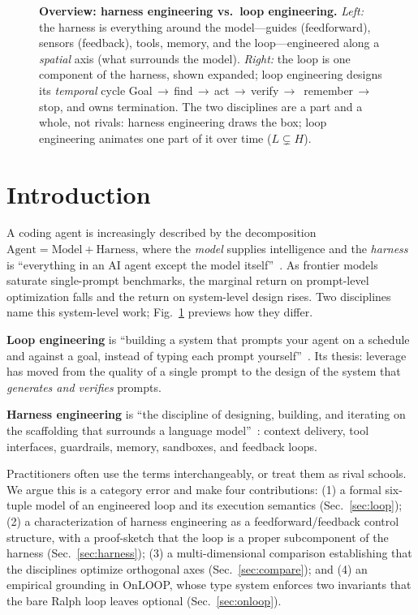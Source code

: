 \documentclass[10pt,twocolumn,letterpaper]{article}
\begin{document}
\begin{figure}[t]
\caption{\textbf{Overview: harness engineering vs.\ loop engineering.}
\emph{Left:} the harness is everything around the model---guides (feedforward),
sensors (feedback), tools, memory, and the loop---engineered along a
\emph{spatial} axis (what surrounds the model). \emph{Right:} the loop is one
component of the harness, shown expanded; loop engineering designs its
\emph{temporal} cycle Goal\,$\to$\,find\,$\to$\,act\,$\to$\,verify\,$\to$\,
remember\,$\to$\,stop, and owns termination. The two disciplines are a part and
a whole, not rivals: harness engineering draws the box; loop engineering
animates one part of it over time ($L \subsetneq H$).}
\label{fig:overview}
\end{figure}

\section{Introduction}
A coding agent is increasingly described by the decomposition
$\mathrm{Agent} = \mathrm{Model} + \mathrm{Harness}$, where the \emph{model}
supplies intelligence and the \emph{harness} is ``everything in an AI agent
except the model itself''~\cite{bockeler,osmaniharness}. As frontier models
saturate single-prompt benchmarks, the marginal return on prompt-level
optimization falls and the return on system-level design rises. Two disciplines
name this system-level work; Fig.~\ref{fig:overview} previews how they differ.

\textbf{Loop engineering} is ``building a system that prompts your agent on a
schedule and against a goal, instead of typing each prompt
yourself''~\cite{osmaniloop}. Its thesis: leverage has moved from the quality of
a single prompt to the design of the system that \emph{generates and verifies}
prompts.

\textbf{Harness engineering} is ``the discipline of designing, building, and
iterating on the scaffolding that surrounds a language
model''~\cite{bockeler}: context delivery, tool interfaces, guardrails, memory,
sandboxes, and feedback loops.

Practitioners often use the terms interchangeably, or treat them as rival
schools. We argue this is a category error and make four contributions:
(1) a formal six-tuple model of an engineered loop and its execution semantics
(Sec.~\ref{sec:loop}); (2) a characterization of harness engineering as a
feedforward/feedback control structure, with a proof-sketch that the loop is a
proper subcomponent of the harness (Sec.~\ref{sec:harness}); (3) a
multi-dimensional comparison establishing that the disciplines optimize
orthogonal axes (Sec.~\ref{sec:compare}); and (4) an empirical grounding in
OnLOOP, whose type system enforces two invariants that the bare Ralph loop
leaves optional (Sec.~\ref{sec:onloop}).
\end{document}
